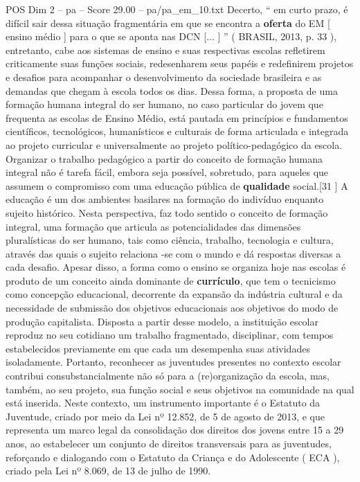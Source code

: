 \begin{textsample}{POS Dim 2 – pa – Score 29.00 – pa/pa\_em\_10.txt}
Decerto, “ em curto prazo, é difícil sair dessa situação fragmentária em que se encontra a \textbf{oferta} do EM [ ensino médio ] para o que se aponta nas DCN [... ] ” ( BRASIL, 2013, p. 33 ), entretanto, cabe aos sistemas de ensino e suas respectivas escolas refletirem criticamente suas funções sociais, redesenharem seus papéis e redefinirem projetos e desafios para acompanhar o desenvolvimento da sociedade brasileira e as demandas que chegam à escola todos os dias.
Dessa forma, a proposta de uma formação humana integral do ser humano, no caso particular do jovem que frequenta as escolas de Ensino Médio, está pautada em princípios e fundamentos científicos, tecnológicos, humanísticos e culturais de forma articulada e integrada ao projeto curricular e universalmente ao projeto político-pedagógico da escola.
Organizar o trabalho pedagógico a partir do conceito de formação humana integral não é tarefa fácil, embora seja possível, sobretudo, para aqueles que assumem o compromisso com uma educação pública de \textbf{qualidade} social.[31 ] A educação é um dos ambientes basilares na formação do indivíduo enquanto sujeito histórico.
Nesta perspectiva, faz todo sentido o conceito de formação integral, uma formação que articula as potencialidades das dimensões pluralísticas do ser humano, tais como ciência, trabalho, tecnologia e cultura, através das quais o sujeito relaciona -se com o mundo e dá respostas diversas a cada desafio.
Apesar disso, a forma como o ensino se organiza hoje nas escolas é produto de um conceito ainda dominante de \textbf{currículo}, que tem o tecnicismo como concepção educacional, decorrente da expansão da indústria cultural e da necessidade de submissão dos objetivos educacionais aos objetivos do modo de produção capitalista.
Disposta a partir desse modelo, a instituição escolar reproduz no seu cotidiano um trabalho fragmentado, disciplinar, com tempos estabelecidos previamente em que cada um desempenha suas atividades isoladamente.
Portanto, reconhecer as juventudes presentes no contexto escolar contribui consubstancialmente não só para a (re)organização da escola, mas, também, ao seu projeto, sua função social e seus objetivos na comunidade na qual está inserida.
Neste contexto, um instrumento importante é o Estatuto da Juventude, criado por meio da Lei nº 12.852, de 5 de agosto de 2013, e que representa um marco legal da consolidação dos direitos dos jovens entre 15 a 29 anos, ao estabelecer um conjunto de direitos transversais para as juventudes, reforçando e dialogando com o Estatuto da Criança e do Adolescente ( ECA ), criado pela Lei nº 8.069, de 13 de julho de 1990.

\end{textsample}
